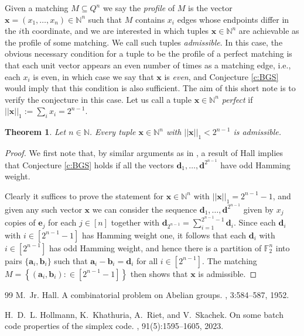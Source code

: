 \documentclass{article}
\newtheorem{theorem}{Theorem}[section]
\begin{document}
Given a matching $M \subseteq Q^n$ we say the \emph{profile} of $M$ is the vector $\bm{x}=(x_1,\ldots, x_n) \in \mathbb{N}^n$ such that $M$ contains $x_i$ edges whose endpoints differ in the $i$th coordinate, and we are interested in which tuples $\bm{x} \in \mathbb{N}^n$ are achievable as the profile of some matching. We call such tuples \emph{admissible}. In this case, the obvious necessary condition for a tuple to be the profile of a perfect matching is that each unit vector appears an even number of times as a matching edge, i.e., each $x_i$ is even, in which case we say that $\bm{x}$ is \emph{even}, and Conjecture \ref{c:BGS} would imply that this condition is also sufficient. The aim of this short note is to verify the conjecture in this case. Let us call a tuple $\bm{x} \in \mathbb{N}^n$  \emph{perfect} if $||\bm{x}||_1 := \sum_i x_i = 2^{n-1}$.

\begin{theorem}\label{c:admissible}
Let $n \in \mathbb{N}$. Every tuple $\bm{x} \in \mathbb{N}^n$ with $||\bm{x}||_1 < 2^{n-1}$ is admissible.
\end{theorem}

\begin{proof}
We first note that, by similar arguments as in \cite[Remark 5.4]{HKAES23}, a result of Hall \cite{HJR52} implies that Conjecture \ref{c:BGS} holds if all the vectors $\bm{d}_1,\ldots,\bm{d}^{2^{n-1}}$ have odd Hamming weight. 

Clearly it suffices to prove the statement for $\bm{x} \in \mathbb{N}^n$ with $||\bm{x}||_1 = 2^{n-1}-1$, and given any such vector $\bm{x}$ we can consider the sequence $\bm{d}_1,\ldots,\bm{d}^{2^{n-1}}$ given by $x_j$ copies of $\bm{e}_j$ for each $j \in [n]$ together with $\bm{d}_{2^{n-1}} = \sum_{i=1}^{2^{n-1}-1} \bm{d}_i$. Since each $\bm{d}_i$ with $i \in \left[2^{n-1}-1\right]$ has Hamming weight one, it follows that each $\bm{d}_i$ with $i\in \left[2^{n-1}\right]$ has odd Hamming weight, and hence there is a partition of $\mathbb{F}^n_2$ into pairs $\{\bm{a}_i,\bm{b}_i\}$ such that $\bm{a}_i - \bm{b}_i = \bm{d}_i$ for all $i \in \left[2^{n-1}\right]$. The matching $
M = \left\{ (\bm{a}_i,\bm{b}_i) \colon  \in \left[2^{n-1}-1\right]\right\}$ then shows that $\bm{x}$ is admissible.
\end{proof}

\begin{thebibliography}{99}
M.~Jr. Hall.
\newblock A combinatorial problem on {Abelian} groups.
, 3:584--587, 1952.

H.~D.~L. Hollmann, K.~Khathuria, A.~Riet, and V.~Skachek.
\newblock On some batch code properties of the simplex code.
, 91(5):1595--1605, 2023.
\end{thebibliography}
\end{document}
